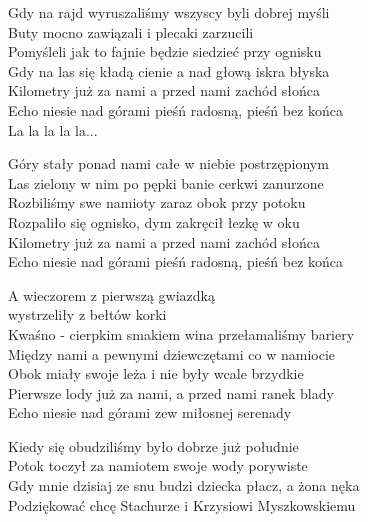 \begin{text}

Gdy na rajd wyruszaliśmy wszyscy byli dobrej myśli\\
Buty mocno zawiązali i plecaki zarzucili\\
Pomyśleli jak to fajnie będzie siedzieć przy ognisku\\
Gdy na las się kładą cienie a nad głową iskra błyska\\
Kilometry już za nami a przed nami zachód słońca\\
Echo niesie nad górami pieśń radosną, pieśń bez końca\\
La la la la la...

Góry stały ponad nami całe w niebie postrzępionym\\
Las zielony w nim po pępki banie cerkwi zanurzone\\
Rozbiliśmy swe namioty zaraz obok przy potoku\\
Rozpaliło się ognisko, dym zakręcił łezkę w oku\\
Kilometry już za nami a przed nami zachód słońca\\
Echo niesie nad górami pieśń radosną, pieśń bez końca

A wieczorem z pierwszą gwiazdką\\
    \vin \vin \vin \vin wystrzeliły z bełtów korki\\
Kwaśno - cierpkim smakiem wina przełamaliśmy bariery\\
Między nami a pewnymi dziewczętami co w namiocie\\
Obok miały swoje leża i nie były wcale brzydkie\\
Pierwsze lody już za nami, a przed nami ranek blady\\
Echo niesie nad górami zew miłosnej serenady

Kiedy się obudziliśmy było dobrze już południe\\
Potok toczył za namiotem swoje wody porywiste\\
Gdy mnie dzisiaj ze snu budzi dziecka płacz, a żona nęka\\
Podziękować chcę Stachurze i Krzysiowi Myszkowskiemu
    
\end{text}
